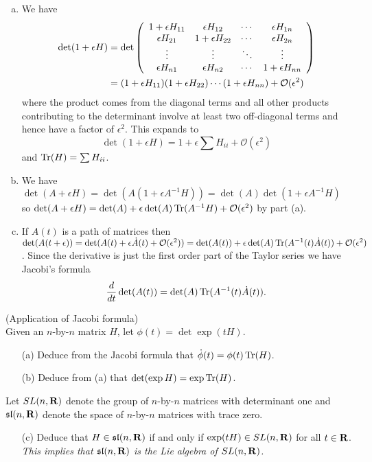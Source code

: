 \documentclass[12pt]{article}
\begin{document}
\begin{answer}
\begin{enumerate}[(a)]
\item We have
\begin{align*}
\det(1+\epsilon H)&=\det\left(\begin{array}{cccc}1+\epsilon H_{11} & \epsilon H_{12} & \cdots & \epsilon H_{1n}\\ \epsilon H_{21} & 1+\epsilon H_{22} & \cdots & \epsilon H_{2n}\\ \vdots & \vdots & \ddots & \vdots\\ \epsilon H_{n1} & \epsilon H_{n2} & \cdots & 1+\epsilon H_{nn}\end{array}\right)\\
&=(1+\epsilon H_{11})(1+\epsilon H_{22})\cdots(1+\epsilon H_{nn})+\mathcal{O}(\epsilon^2)
\end{align*}
where the product comes from the diagonal terms and all other products contributing to the determinant involve at least two off-diagonal terms and hence have a factor of $\epsilon^2$. This expands to
\[\det(1+\epsilon H)=1+\epsilon\sum H_{ii}+\mathcal{O}(\epsilon^2)\]
and $\operatorname{Tr}(H)=\sum H_{ii}$.
\item We have $\det(A+\epsilon H)=\det(A(1+\epsilon A^{-1}H))=\det(A)\det(1+\epsilon A^{-1}H)$ so $\det(A+\epsilon H)=\det(A)+\epsilon\det(A)\operatorname{Tr}(A^{-1}H)+\mathcal{O}(\epsilon^2)$ by part (a).
\item If $A(t)$ is a path of matrices then $\det(A(t+\epsilon))=\det(A(t)+\epsilon\dot{A}(t)+\mathcal{O}(\epsilon^2))=\det(A(t))+\epsilon\det(A)\operatorname{Tr}(A^{-1}(t)\dot{A}(t))+\mathcal{O}(\epsilon^2)$. Since the derivative is just the first order part of the Taylor series we have Jacobi's formula
\[\frac{d}{dt}\det(A(t))=\det(A)\operatorname{Tr}(A^{-1}(t)\dot{A}(t)).\]
\end{enumerate}
\end{answer}
\newpage

\bigskip

\begin{question}(Application of Jacobi formula)\\
Given an $n$-by-$n$ matrix $H$, let $\phi(t)=\det\exp(tH)$.
\begin{enumerate}
\item[(a)] Deduce from the Jacobi formula that $\dot{\phi}(t)=\phi(t)\operatorname{Tr}(H)$.
\item[(b)] Deduce from (a) that $\det(\exp H)=\exp\operatorname{Tr}(H)$.
\end{enumerate}
Let $SL(n,\mathbf{R})$ denote the group of $n$-by-$n$ matrices with determinant one and $\mathfrak{sl}(n,\mathbf{R})$ denote the space of $n$-by-$n$ matrices with trace zero.
\begin{enumerate}
\item[(c)] Deduce that $H\in\mathfrak{sl}(n,\mathbf{R})$ if and only if $\exp(tH)\in SL(n,\mathbf{R})$ for all $t\in\mathbf{R}$. {\em This implies that $\mathfrak{sl}(n,\mathbf{R})$ is the Lie algebra of $SL(n,\mathbf{R})$.}
\end{enumerate}
\end{question}
\end{document}
